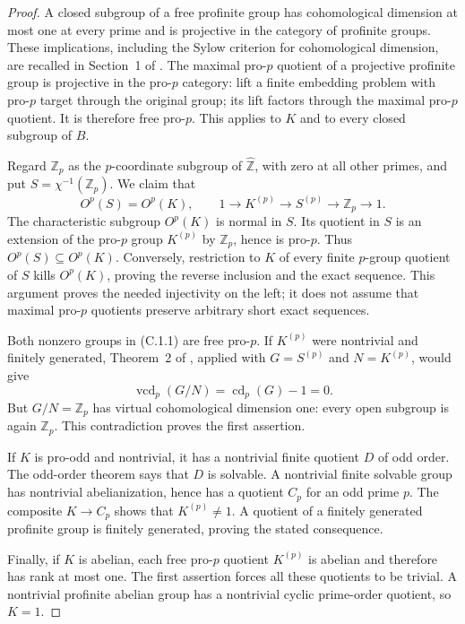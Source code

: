 \begin{proof}
A closed subgroup of a free profinite group has cohomological dimension
at most one at every prime and is projective in the category of profinite
groups.  These implications, including the Sylow criterion for
cohomological dimension, are recalled in Section~1 of
\cite{CEEnglerHaranKochloukovaZalesskii2004}.  The maximal pro-$p$
quotient of a projective profinite group is projective in the pro-$p$
category: lift a finite embedding problem with pro-$p$ target through the
original group; its lift factors through the maximal pro-$p$ quotient.
It is therefore free pro-$p$.  This applies to $K$ and to every closed
subgroup of $B$.

Regard $\mathbb Z_p$ as the $p$-coordinate subgroup of
$\widehat{\mathbb Z}$, with zero at all other primes, and put
$S=\chi^{-1}(\mathbb Z_p)$.  We claim that
\[
 O^p(S)=O^p(K),\qquad
 1\longrightarrow K^{(p)}\longrightarrow S^{(p)}
       \longrightarrow\mathbb Z_p\longrightarrow1.             \tag{C.1.1}
\]
The characteristic subgroup $O^p(K)$ is normal in $S$.  Its quotient
in $S$ is an extension of the pro-$p$ group $K^{(p)}$ by
$\mathbb Z_p$, hence is pro-$p$.  Thus $O^p(S)\subseteq O^p(K)$.
Conversely, restriction to $K$ of every finite $p$-group quotient of
$S$ kills $O^p(K)$, proving the reverse inclusion and the exact
sequence.  This argument proves the needed injectivity on the left;
it does not assume that maximal pro-$p$ quotients preserve arbitrary
short exact sequences.

Both nonzero groups in (C.1.1) are free pro-$p$.  If $K^{(p)}$ were
nontrivial and finitely generated, Theorem~2 of
\cite{CEEnglerHaranKochloukovaZalesskii2004}, applied with
$G=S^{(p)}$ and $N=K^{(p)}$, would give
\[
 \operatorname{vcd}_p(G/N)=\operatorname{cd}_p(G)-1=0.
\]
But $G/N=\mathbb Z_p$ has virtual cohomological dimension one: every
open subgroup is again $\mathbb Z_p$.  This contradiction proves the
first assertion.

If $K$ is pro-odd and nontrivial, it has a nontrivial finite quotient
$D$ of odd order.  The odd-order theorem
\cite{CEFeitThompson1963} says that $D$ is solvable.  A nontrivial
finite solvable group has nontrivial abelianization, hence has a
quotient $C_p$ for an odd prime $p$.  The composite $K\to C_p$
shows that $K^{(p)}\ne1$.  A quotient of a finitely generated profinite
group is finitely generated, proving the stated consequence.

Finally, if $K$ is abelian, each free pro-$p$ quotient $K^{(p)}$ is
abelian and therefore has rank at most one.  The first assertion
forces all these quotients to be trivial.  A nontrivial profinite
abelian group has a nontrivial cyclic prime-order quotient, so $K=1$.
\end{proof}

